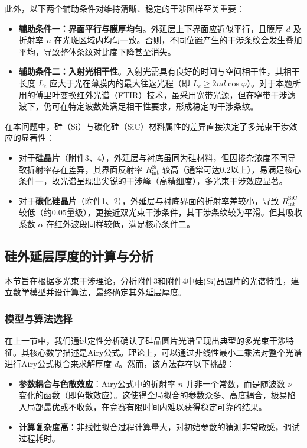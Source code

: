 \documentclass[withoutpreface,bwprint]{cumcmthesis} %
\begin{document}
\noindent 此外，以下两个辅助条件对维持清晰、稳定的干涉图样至关重要：

\begin{itemize}
    \item \textbf{辅助条件一：界面平行与膜厚均匀}。外延层上下界面应近似平行，且膜厚 $d$ 及折射率 $n$ 在光斑区域内均匀一致。否则，不同位置产生的干涉条纹会发生叠加平均，导致整体条纹对比度下降甚至消失。

    \item \textbf{辅助条件二：入射光相干性}。入射光需具有良好的时间与空间相干性，其相干长度 $L_c$ 应大于光在薄膜内的最大往返光程（即 $L_c \geq 2nd\cos\varphi$）。对于本题所用的傅里叶变换红外光谱（FTIR）技术，虽采用宽带光源，但在窄带干涉滤波下，仍可在特定波数处满足相干性要求，形成稳定的干涉条纹。
\end{itemize}

\noindent 在本问题中，硅（Si）与碳化硅（SiC）材料属性的差异直接决定了多光束干涉效应的显著性：
\begin{itemize}
    \item 对于\textbf{硅晶片}（附件3、4），外延层与衬底虽同为硅材料，但因掺杂浓度不同导致折射率存在差异，其界面反射率 $R_{\text{int}}^{\text{Si}}$ 较高（通常可达$0.2$以上），易满足核心条件一，故光谱呈现出尖锐的干涉峰（高精细度），多光束干涉效应显著。
    \item 对于\textbf{碳化硅晶片}（附件1、2），外延层与衬底界面的折射率差较小，导致 $R_{\text{int}}^{\text{SiC}}$ 较低（约$0.05$量级），更接近双光束干涉条件，其干涉条纹较为平滑。但其吸收系数 $\alpha$ 在红外波段同样较低，满足核心条件二。
\end{itemize}

\subsection{硅外延层厚度的计算与分析}

本节旨在根据多光束干涉理论，分析附件3和附件4中硅(Si)晶圆片的光谱特性，建立数学模型并设计算法，最终确定其外延层厚度。

\subsubsection{模型与算法选择}

在上一节中，我们通过定性分析确认了硅晶圆片光谱呈现出典型的多光束干涉特征。其核心数学描述是Airy公式。理论上，可以通过非线性最小二乘法对整个光谱进行Airy公式拟合来求解厚度 $d$。然而，该方法存在以下挑战：
\begin{itemize}
    \item \textbf{参数耦合与色散效应}：Airy公式中的折射率 $n$ 并非一个常数，而是随波数 $\nu$ 变化的函数（即色散效应）。这使得全局拟合的参数众多、高度耦合，极易陷入局部最优或不收敛，在竞赛有限时间内难以获得稳定可靠的结果。
    \item \textbf{计算复杂度高}：非线性拟合过程计算量大，对初始参数的猜测非常敏感，调试过程耗时。
\end{itemize}
\end{document}
